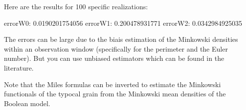 \noindent Here are the results for 100 specific realizations:
\begin{sh}
errorW0:  0.0190201754056
errorW1:  0.200478931771
errorW2:  0.0342984925035
\end{sh}

The errors can be large due to the biais estimation of the Minkowski densities within an observation window (specifically for the perimeter and the Euler number). But you can use unbiased estimators which can be found in the literature.

\noindent Note that the Miles formulas can be inverted to estimate the Minkowski functionals of the typocal grain from the Minkowski mean densities of the Boolean model.
